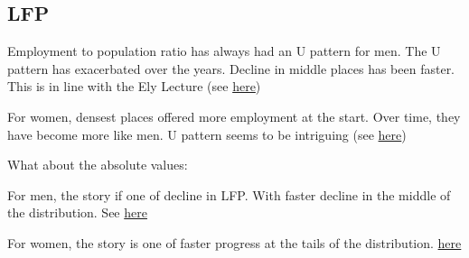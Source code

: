 \subsection{LFP}
\bitem
	\item Employment to population ratio has always had an U pattern for men. The U pattern has exacerbated over the years. Decline in middle places has been faster. This is in line with the Ely Lecture (see \href{https://www.dropbox.com/s/w0m6oerp6mt7edg/bar_graph_lfp_male.png?dl=0}{here})
	\item For women, densest places offered more employment at the start. Over time, they have become more like men. U pattern seems to be intriguing  (see \href{https://www.dropbox.com/s/mhlqjp6k73i9ub4/bar_graph_lfp_women.png?dl=0}{here})
	\item What about the absolute values:
	\bitem
		\item For men, the story if one of decline in LFP. With faster decline in the middle of the distribution. See \href{https://www.dropbox.com/s/rdhcj6im9xt1ad3/bar_graph_d_lfp_male.png?dl=0}{here}
		\item For women, the story is one of faster progress at the tails of the distribution. \href{https://www.dropbox.com/s/sl9vlat28ongdlb/bar_graph_d_lfp_female.png?dl=0}{here}
	\eitem
\eitem 


